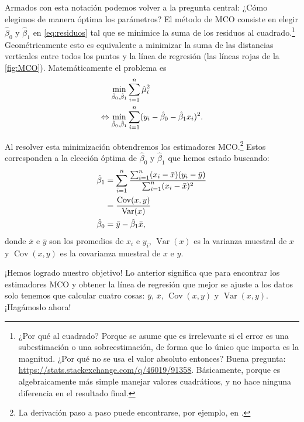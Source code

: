 \documentclass[12pt]{report}\usepackage[]{graphicx}\usepackage[]{color}
\newcommand{\Var}{\operatorname{Var}}
\newcommand{\Cov}{\operatorname{Cov}}
\begin{document}
Armados con esta notación podemos volver a la pregunta central: ¿Cómo elegimos de manera óptima los parámetros?
El método de MCO consiste en elegir $\hat\beta_0$ y $\hat\beta_1$ en \eqref{eq:residuos} tal que se minimice la suma de los residuos al cuadrado.\footnote{¿Por qué al cuadrado? Porque se asume que es irrelevante si el error es una subestimación o una sobreestimación, de forma que lo único que importa es la magnitud. ¿Por qué no se usa el valor absoluto entonces? Buena pregunta: \url{https://stats.stackexchange.com/q/46019/91358}. Básicamente, porque es algebraicamente más simple manejar valores cuadráticos, y no hace ninguna diferencia en el resultado final.}
Geométricamente esto es equivalente a minimizar la suma de las distancias verticales entre todos los puntos y la línea de regresión (las líneas rojas de la \autoref{fig:MCO}).
Matemáticamente el problema es
\begin{align}
\min_{\hat\beta_0,\hat\beta_1} & \sum_{i=1}^n \hat\mu_i^2 \notag \\
\Leftrightarrow \min_{\hat\beta_0,\hat\beta_1} & \sum_{i=1}^n (y_i - \hat\beta_0 - \hat\beta_1 x_i)^2.
\label{eq:prob_min_MCO}
\end{align}

Al resolver esta minimización obtendremos los estimadores MCO.\footnote{La derivación paso a paso puede encontrarse, por ejemplo, en \textcite[cap. 2]{wooldridge_introductory_2016}.}
Estos corresponden a la elección óptima de $\hat\beta_0$ y $\hat\beta_1$ que hemos estado buscando:
\begin{align}
\hat \beta_1 &= \sum_{i=1}^n \frac{\sum_{i=1}^n (x_i - \bar x)(y_i - \bar y)}{\sum_{i=1}^n (x_i - \bar x)^2} \notag \\
 &= \frac{\Cov (x,y)}{\Var(x)} \label{eq:MCO_beta1} \\
\hat \beta_0 &= \bar y - \hat\beta_1 \bar x, \label{eq:MCO_beta0}
\end{align}
donde $\bar x$ e $\bar y$ son los promedios de $x_i$ e $y_i$, $\Var(x)$ es la varianza muestral de $x$ y $\Cov(x,y)$ es la covarianza muestral de $x$ e $y$.

¡Hemos logrado nuestro objetivo!
Lo anterior significa que para encontrar los estimadores MCO y obtener la línea de regresión que mejor se ajuste a los datos solo tenemos que calcular cuatro cosas: $\bar y$, $\bar x$, $\Cov (x,y)$ y $\Var (x,y)$. ¡Hagámoslo ahora!
\end{document}
